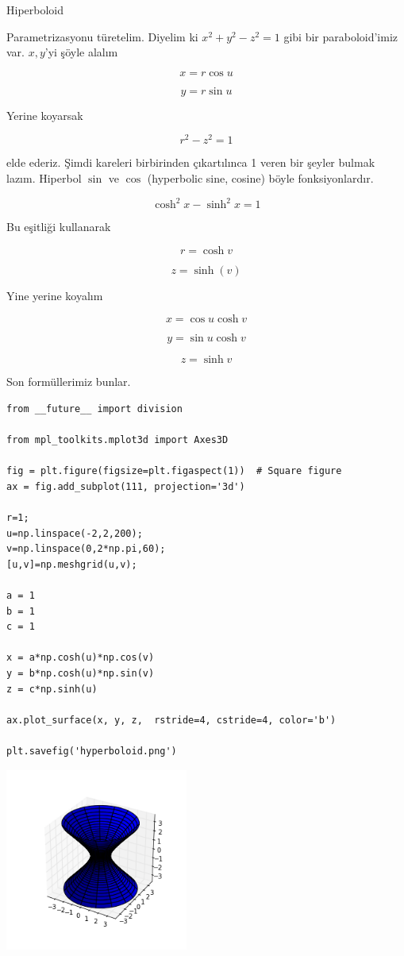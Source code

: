 \documentclass[12pt,fleqn]{article}\usepackage{../../common}
\begin{document}
Hiperboloid 

Parametrizasyonu türetelim. Diyelim ki $x^2 + y^2 - z^2 = 1$ gibi bir
paraboloid'imiz var. $x,y$'yi şöyle alalım

$$ x = r \cos u $$

$$ y = r \sin u $$

Yerine koyarsak

$$ r^2 - z^2 = 1 $$

elde ederiz. Şimdi kareleri birbirinden çıkartılınca 1 veren bir şeyler
bulmak lazım. Hiperbol $\sin$ ve $\cos$ (hyperbolic sine, cosine) böyle
fonksiyonlardır. 

$$ \cosh^2x - \sinh^2x = 1 $$

Bu eşitliği kullanarak 

$$ r = \cosh v $$

$$ z = \sinh(v) $$

Yine yerine koyalım

$$ x = \cos u \cosh v $$

$$ y = \sin u \cosh v $$

$$ z = \sinh v $$

Son formüllerimiz bunlar.

\begin{verbatim}
from __future__ import division

from mpl_toolkits.mplot3d import Axes3D

fig = plt.figure(figsize=plt.figaspect(1))  # Square figure
ax = fig.add_subplot(111, projection='3d')

r=1;
u=np.linspace(-2,2,200);
v=np.linspace(0,2*np.pi,60);
[u,v]=np.meshgrid(u,v);

a = 1
b = 1
c = 1

x = a*np.cosh(u)*np.cos(v)
y = b*np.cosh(u)*np.sin(v)
z = c*np.sinh(u)

ax.plot_surface(x, y, z,  rstride=4, cstride=4, color='b')

plt.savefig('hyperboloid.png')
\end{verbatim}

\includegraphics[height=6cm]{hyperboloid.png}
\end{document}
